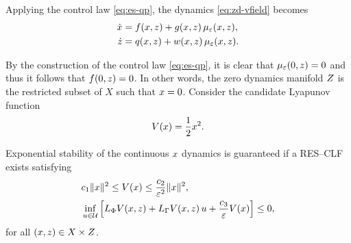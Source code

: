 \documentclass[twocolumn]{article}
\begin{document}
Applying the control law \eqref{eq:es-qp}, the dynamics \eqref{eq:zd-vfield} becomes
\begin{align}
  \nonumber
  \dot {x} &= f(x, z) + g(x, z) \, \mu_{\varepsilon}(x, z),\\
  \dot {z} &= q(x, z) + w(x, z) \, \mu_{\varepsilon}(x, z).
  \label{eq:zd-vfield-cl}
\end{align}

By the construction of the control law \eqref{eq:es-qp}, it is clear that $\mu_{\varepsilon}(0, z) = 0$ and thus it follows that $f(0, z) = 0$.
%
In other words, the zero dynamics manifold $Z$ is the restricted subset of $X$ such that $x = 0$.
%
Consider the candidate Lyapunov function
\begin{align}
  V(x) = \frac{1}{2} x^{2}.
\end{align}

\begin{proposition}  
  \label{prop:res-clf}
  Exponential stability of the continuous $x$ dynamics is guaranteed if a RES--CLF exists satisfying
  \begin{align}
    \label{eq:lyap-cond-nrg-es}
    &c_{1} \|x\|^{2} \leq V(x) \leq \frac{c_{2}}{\varepsilon^{2}} \|x\|^2,\\
    \nonumber
    &\inf_{u \in \mathcal{U}} \left[ L_{\Phi} V(x, z) + L_{\Gamma} V(x, z) \, u + \frac{c_{3}}{\varepsilon} V(x) \right] \leq 0,
  \end{align}
  for all $(x, z) \in X \times Z$.
\end{proposition}
\end{document}
